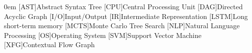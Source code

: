 \begin{acronym}[LSTM]\itemsep0em
    [AST]{Abstract Syntax Tree}
    [CPU]{Central Processing Unit}
    [DAG]{Directed Acyclic Graph}
    [I/O]{Input/Output}
    [IR]{Intermediate Representation}
    [LSTM]{Long short-term memory}
    [MCTS]{Monte Carlo Tree Search}
    [NLP]{Natural Language Processing}
    [OS]{Operating System}
    [SVM]{Support Vector Machine}
    [XFG]{Contextual Flow Graph}
\end{acronym}
